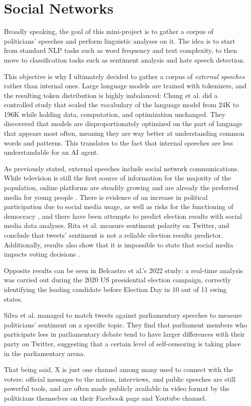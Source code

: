 \section{Social Networks}

Broadly speaking, the goal of this mini-project is to gather a corpus of politicians' speeches and perform linguistic analyses on it. The idea is to start from standard NLP tasks such as word frequency and text complexity, to then move to classification tasks such as sentiment analysis and hate speech detection.

This objective is why I ultimately decided to gather a corpus of \textit{external speeches} rather than internal ones. Large language models are trained with tokenizers, and the resulting token distribution is highly imbalanced: Chung et al. \cite{chung_exploiting_2025} did a controlled study that scaled the vocabulary of the language model from 24K to 196K while holding data, computation, and optimization unchanged. They discovered that models are disproportionately optimized on the part of language that appears most often, meaning they are way better at understanding common words and patterns. This translates to the fact that internal speeches are less understandable for an AI agent. 

As previously stated, external speeches include social network communications. While television is still the first source of information for the majority of the population, online platforms are steadily growing and are already the preferred media for young people \cite{eurobarometer_media_2023,maher_twice_2024}. There is evidence of an increase in political participation due to social media usage, as well as risks for the functioning of democracy \cite{lorenz-spreen_systematic_2023,amsalem_people_2023}, and there have been attempts to predict election results with social media data analyses. Rita et al. measure sentiment polarity on Twitter, and conclude that tweets' sentiment is not a reliable election results predictor. Additionally, results also show that it is impossible to state that social media impacts voting decisions \cite{rita_social_2023}. 

Opposite results can be seen in Belcastro et al.'s \cite{belcastro_analyzing_2022} 2022 study: a real-time analysis was carried out during the 2020 US presidential election campaign, correctly identifying the leading candidate before Election Day in 10 out of 11 swing states.

Silva et al. \cite{silva_politicians_2022} managed to match tweets against parliamentary speeches to measure politicians' sentiment on a specific topic. They find that parliament members who participate less in parliamentary debate tend to have larger differences with their party on Twitter, suggesting that a certain level of self-censoring is taking place in the parliamentary arena.

That being said, X is just one channel among many used to connect with the voters: official messages to the nation, interviews, and public speeches are still powerful tools, and are often made publicly available in video format by the politicians themselves on their Facebook page and Youtube channel.
